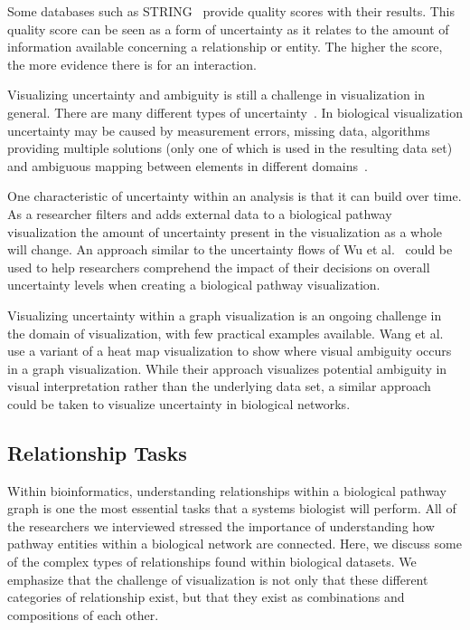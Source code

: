 \documentclass[twocolumn]{bmcart}%
\begin{document}
Some databases such as STRING~\cite{STRING2005} provide quality scores with their results.
This quality score can be seen as a form of uncertainty as it relates to the amount of information available concerning a relationship or entity.
The higher the score, the more evidence there is for an interaction.

Visualizing uncertainty and ambiguity is still a challenge in visualization in general.
There are many different types of uncertainty~\cite{skeels2010uncertainty}.
In biological visualization uncertainty may be caused by measurement errors, missing data, algorithms providing multiple solutions (only one of which is used in the resulting data set) and ambiguous mapping between elements in different domains~\cite{kohlbacher2014multivariate}.

One characteristic of uncertainty within an analysis is that it can build over time.
As a researcher filters and adds external data to a biological pathway visualization the amount of uncertainty present in the visualization as a whole will change.
An approach similar to the uncertainty flows of Wu et al.~\cite{wu2012uncertainty} could be used to help researchers comprehend the impact of their decisions on overall uncertainty levels when creating a biological pathway visualization.

Visualizing uncertainty within a graph visualization is an ongoing challenge in the domain of visualization, with few practical examples available.
Wang et al.~\cite{wang2016ambiguityvis} use a variant of a heat map visualization to show where visual ambiguity occurs in a graph visualization.
While their approach visualizes potential ambiguity in visual interpretation rather than the underlying data set, a similar approach could be taken to visualize uncertainty in biological networks.

\subsection*{Relationship Tasks}

Within bioinformatics,  understanding relationships within a biological pathway graph is one the most essential tasks that a systems biologist will perform.
All of the researchers we interviewed stressed the importance of understanding how pathway entities within a biological network are connected.
Here, we discuss some of the complex types of relationships found within biological datasets.
We emphasize that the challenge of visualization is not only that these different categories of relationship exist, but that they exist as combinations and compositions of each other.
\end{document}

